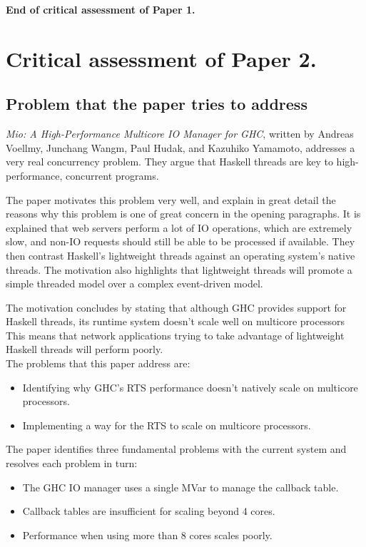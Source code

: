 \documentclass[9pt]{report}
\begin{document}
\noindent
{\bf End of critical assessment of Paper 1.}
\clearpage

\section*{Critical assessment of Paper 2.}
\subsection*{Problem that the paper tries to address}
{\it Mio: A High-Performance Multicore IO Manager for GHC}, written by Andreas Voellmy, Junchang Wangm, Paul Hudak, and Kazuhiko Yamamoto, addresses a very real concurrency problem.
They argue that Haskell threads are key to high-performance, concurrent programs.

The paper motivates this problem very well, and explain in great detail the reasons why this problem is one of great concern in the opening paragraphs.
It is explained that web servers perform a lot of IO operations, which are extremely slow, and non-IO requests should still be able to be processed if available.
They then contrast Haskell's lightweight threads against an operating system's native threads.
The motivation also highlights that lightweight threads will promote a simple threaded model over a complex event-driven model.

The motivation concludes by stating that although GHC provides support for Haskell threads, its runtime system doesn't scale well on multicore processors
This means that network applications trying to take advantage of lightweight Haskell threads will perform poorly.\\

\noindent
The problems that this paper address are:

\begin{itemize}
\item Identifying why GHC's RTS performance doesn't natively scale on multicore processors.
\item Implementing a way for the RTS to scale on multicore processors.
\end{itemize}

\noindent
The paper identifies three fundamental problems with the current system and resolves each problem in turn:

\begin{itemize}
\item The GHC IO manager uses a single MVar to manage the callback table.
\item Callback tables are insufficient for scaling beyond 4 cores.
\item Performance when using more than 8 cores scales poorly.
\end{itemize}
\end{document}
